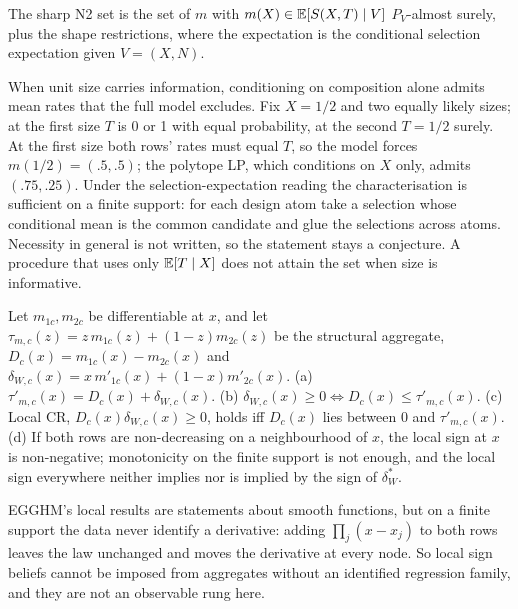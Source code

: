 \begin{conjecture}\label{conj:N2}
The sharp N2 set is the set of $m$ with $m(X)\in\mathbb E[S(X,T)\mid V]$ $P_V$-almost
surely, plus the shape restrictions, where the expectation is the conditional
selection expectation given $V=(X,N)$.
\end{conjecture}
\begin{reading}
When unit size carries information, conditioning on composition alone admits mean
rates that the full model excludes. Fix $X=1/2$ and two equally likely sizes; at
the first size $T$ is 0 or 1 with equal probability, at the second $T=1/2$ surely.
At the first size both rows' rates must equal $T$, so the model forces
$m(1/2)=(.5,.5)$; the polytope LP, which conditions on $X$ only, admits
$(.75,.25)$. Under the selection-expectation reading the characterisation is
sufficient on a finite support: for each design atom take a selection whose
conditional mean is the common candidate and glue the selections across atoms.
Necessity in general is not written, so the statement stays a conjecture. A
procedure that uses only $\mathbb E[T\mid X]$ does not attain the set when size is
informative.
\end{reading}

\begin{proposition}\label{prop:N23}
Let $m_{1c},m_{2c}$ be differentiable at $x$, and let
$\tau_{m,c}(z)=z\,m_{1c}(z)+(1-z)m_{2c}(z)$ be the structural aggregate,
$D_c(x)=m_{1c}(x)-m_{2c}(x)$ and $\delta_{W,c}(x)=x\,m'_{1c}(x)+(1-x)m'_{2c}(x)$.
(a) $\tau'_{m,c}(x)=D_c(x)+\delta_{W,c}(x)$. (b) $\delta_{W,c}(x)\ge0\iff
D_c(x)\le\tau'_{m,c}(x)$. (c) Local CR, $D_c(x)\delta_{W,c}(x)\ge0$, holds iff
$D_c(x)$ lies between 0 and $\tau'_{m,c}(x)$. (d) If both rows are non-decreasing on
a neighbourhood of $x$, the local sign at $x$ is non-negative; monotonicity on the
finite support is not enough, and the local sign everywhere neither implies nor is
implied by the sign of $\delta^*_W$.
\end{proposition}
\begin{reading}
EGGHM's local results are statements about smooth functions, but on a finite
support the data never identify a derivative: adding
$\prod_j(x-x_j)$ to both rows leaves the law unchanged and moves the derivative at
every node. So local sign beliefs cannot be imposed from aggregates without an
identified regression family, and they are not an observable rung here.
\end{reading}

